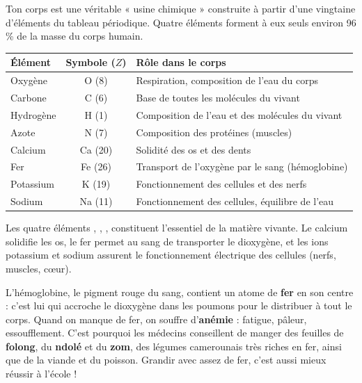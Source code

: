 \documentclass[11pt]{article}
\newcommand{\cle}[1]{{\popxbold\color{popdark}#1}}
\begin{document}
Ton corps est une véritable « usine chimique » construite à partir d'une vingtaine d'éléments du tableau périodique. Quatre éléments forment à eux seuls environ 96 \% de la masse du corps humain.

\begin{center}
\begin{tabularx}{\linewidth}{|l|c|X|}
\hline
\rowcolor{popblueL} \textbf{Élément} & \textbf{Symbole ($Z$)} & \textbf{Rôle dans le corps} \\
\hline
Oxygène & O (8) & Respiration, composition de l'eau du corps \\
\hline
Carbone & C (6) & Base de toutes les molécules du vivant \\
\hline
Hydrogène & H (1) & Composition de l'eau et des molécules du vivant \\
\hline
Azote & N (7) & Composition des protéines (muscles) \\
\hline
Calcium & Ca (20) & Solidité des os et des dents \\
\hline
Fer & Fe (26) & Transport de l'oxygène par le sang (hémoglobine) \\
\hline
Potassium & K (19) & Fonctionnement des cellules et des nerfs \\
\hline
Sodium & Na (11) & Fonctionnement des cellules, équilibre de l'eau \\
\hline
\end{tabularx}
\end{center}

\begin{aretenir}[À retenir]
Les quatre éléments , , ,  constituent l'essentiel de la matière vivante. Le \cle{calcium}  solidifie les os, le \cle{fer}  permet au sang de transporter le dioxygène, et les ions \cle{potassium}  et \cle{sodium}  assurent le fonctionnement électrique des cellules (nerfs, muscles, cœur).
\end{aretenir}

\begin{savaistu}
L'hémoglobine, le pigment rouge du sang, contient un atome de \textbf{fer} en son centre : c'est lui qui accroche le dioxygène dans les poumons pour le distribuer à tout le corps. Quand on manque de fer, on souffre d'\textbf{anémie} : fatigue, pâleur, essoufflement. C'est pourquoi les médecins conseillent de manger des feuilles de \textbf{folong}, du \textbf{ndolé} et du \textbf{zom}, des légumes camerounais très riches en fer, ainsi que de la viande et du poisson. Grandir avec assez de fer, c'est aussi mieux réussir à l'école !
\end{savaistu}
\end{document}
